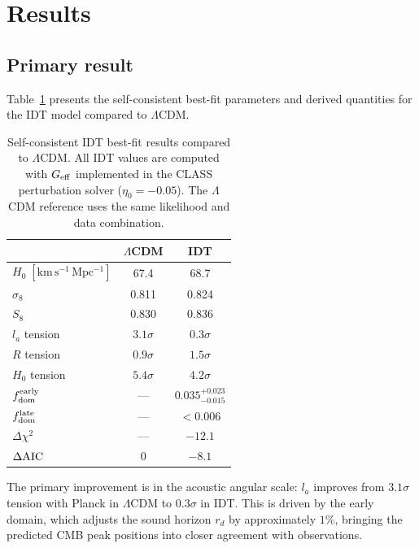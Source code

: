 \documentclass[aps,prd,twocolumn,superscriptaddress,nofootinbib]{revtex4-2}
\newcommand{\fdom}{f_{\rm dom}}
\newcommand{\Geff}{G_{\rm eff}}
\newcommand{\dAIC}{\Delta{\rm AIC}}
\newcommand{\dchi}{\Delta\chi^2}
\begin{document}
\section{Results}
\label{sec:results}

\subsection{Primary result}

Table~\ref{tab:primary} presents the self-consistent best-fit
parameters and derived quantities for the IDT model compared to
$\Lambda$CDM.

\begin{table}[h]
\centering
\caption{Self-consistent IDT best-fit results compared to $\Lambda$CDM.
All IDT values are computed with $\Geff$ implemented in the CLASS
perturbation solver ($\eta_0 = -0.05$). The $\Lambda$CDM reference uses
the same likelihood and data combination.}
\label{tab:primary}
\begin{tabular}{lcc}
\hline\hline
 & $\Lambda$CDM & IDT \\
\hline
$H_0\;[\mathrm{km\,s^{-1}\,Mpc^{-1}}]$ & 67.4 & 68.7 \\
$\sigma_8$ & 0.811 & 0.824 \\
$S_8$ & 0.830 & 0.836 \\
$l_a$ tension & $3.1\sigma$ & $0.3\sigma$ \\
$R$ tension & $0.9\sigma$ & $1.5\sigma$ \\
$H_0$ tension & $5.4\sigma$ & $4.2\sigma$ \\
$\fdom^{\rm early}$ & --- & $0.035^{+0.023}_{-0.015}$ \\
$\fdom^{\rm late}$ & --- & $< 0.006$ \\
$\dchi$ & --- & $-12.1$ \\
$\dAIC$ & 0 & $-8.1$ \\
\hline\hline
\end{tabular}
\end{table}

The primary improvement is in the acoustic angular scale: $l_a$
improves from $3.1\sigma$ tension with Planck in $\Lambda$CDM to
$0.3\sigma$ in IDT. This is driven by the early domain, which
adjusts the sound horizon $r_d$ by approximately $1\%$, bringing the
predicted CMB peak positions into closer agreement with observations.
\end{document}
